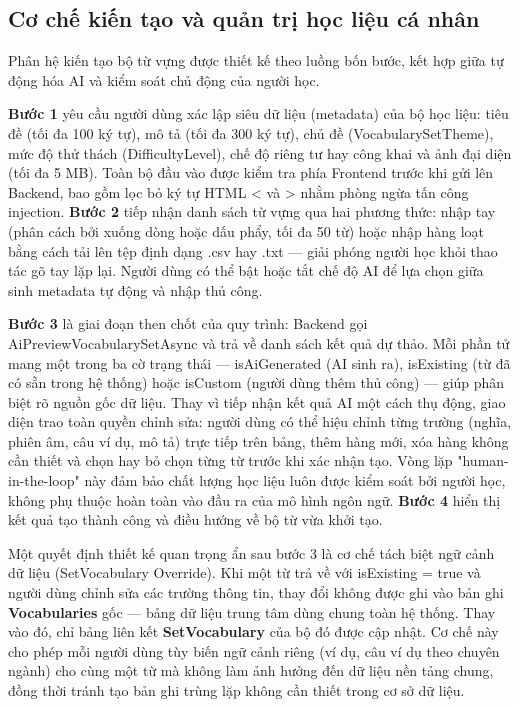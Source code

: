 \subsection{Cơ chế kiến tạo và quản trị học liệu cá nhân}

Phân hệ kiến tạo bộ từ vựng được thiết kế theo luồng bốn bước, kết hợp giữa tự động hóa AI và kiểm soát chủ động của người học.

\textbf{Bước 1} yêu cầu người dùng xác lập siêu dữ liệu (metadata) của bộ học liệu: tiêu đề (tối đa 100 ký tự), mô tả (tối đa 300 ký tự), chủ đề (VocabularySetTheme), mức độ thử thách (DifficultyLevel), chế độ riêng tư hay công khai và ảnh đại diện (tối đa 5 MB). Toàn bộ đầu vào được kiểm tra phía Frontend trước khi gửi lên Backend, bao gồm lọc bỏ ký tự HTML < và > nhằm phòng ngừa tấn công injection. \textbf{Bước 2} tiếp nhận danh sách từ vựng qua hai phương thức: nhập tay (phân cách bởi xuống dòng hoặc dấu phẩy, tối đa 50 từ) hoặc nhập hàng loạt bằng cách tải lên tệp định dạng .csv hay .txt — giải phóng người học khỏi thao tác gõ tay lặp lại. Người dùng có thể bật hoặc tắt chế độ AI để lựa chọn giữa sinh metadata tự động và nhập thủ công.

\textbf{Bước 3} là giai đoạn then chốt của quy trình: Backend gọi AiPreviewVocabularySetAsync và trả về danh sách kết quả dự thảo. Mỗi phần tử mang một trong ba cờ trạng thái — isAiGenerated (AI sinh ra), isExisting (từ đã có sẵn trong hệ thống) hoặc isCustom (người dùng thêm thủ công) — giúp phân biệt rõ nguồn gốc dữ liệu. Thay vì tiếp nhận kết quả AI một cách thụ động, giao diện trao toàn quyền chỉnh sửa: người dùng có thể hiệu chỉnh từng trường (nghĩa, phiên âm, câu ví dụ, mô tả) trực tiếp trên bảng, thêm hàng mới, xóa hàng không cần thiết và chọn hay bỏ chọn từng từ trước khi xác nhận tạo. Vòng lặp "human-in-the-loop" này đảm bảo chất lượng học liệu luôn được kiểm soát bởi người học, không phụ thuộc hoàn toàn vào đầu ra của mô hình ngôn ngữ. \textbf{Bước 4} hiển thị kết quả tạo thành công và điều hướng về bộ từ vừa khởi tạo.

Một quyết định thiết kế quan trọng ẩn sau bước 3 là cơ chế tách biệt ngữ cảnh dữ liệu (SetVocabulary Override). Khi một từ trả về với isExisting = true và người dùng chỉnh sửa các trường thông tin, thay đổi không được ghi vào bản ghi \textbf{Vocabularies} gốc — bảng dữ liệu trung tâm dùng chung toàn hệ thống. Thay vào đó, chỉ bảng liên kết \textbf{SetVocabulary} của bộ đó được cập nhật. Cơ chế này cho phép mỗi người dùng tùy biến ngữ cảnh riêng (ví dụ, câu ví dụ theo chuyên ngành) cho cùng một từ mà không làm ảnh hưởng đến dữ liệu nền tảng chung, đồng thời tránh tạo bản ghi trùng lặp không cần thiết trong cơ sở dữ liệu.

